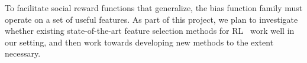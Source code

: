 To facilitate social reward functions that generalize, the bias
function family must operate on a set of useful features.  As part of
this project, we plan to investigate whether existing state-of-the-art
feature selection methods for
RL~\cite{diuk2009adaptive,kolter2009regularization,li2009reinforcement,parr2008analysis}
work well in our setting, and then work towards developing new methods
to the extent necessary.




